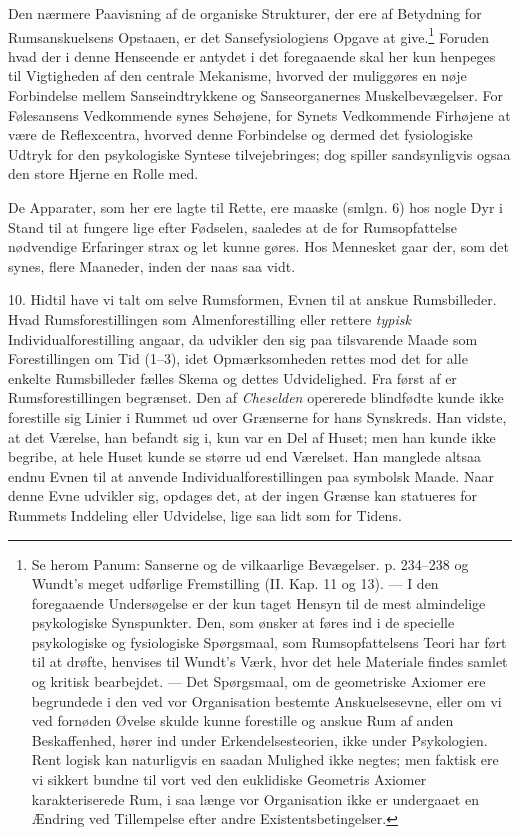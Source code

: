 \documentclass[12pt,a4paper,openany]{book}
\newcommand{\opage}[1]{\marginnote{\footnotesize\textit{[#1]}}}
\begin{document}
Den nærmere Paavisning af de organiske Strukturer, der ere af Betydning
for Rumsanskuelsens Opstaaen, er det Sansefysiologiens Opgave at
give.\footnote[2]{Se herom Panum: Sanserne og de vilkaarlige Bevægelser.
p. 234--238 og Wundt’s meget udførlige Fremstilling (II. Kap. 11 og 13).
--- I den foregaaende Undersøgelse er der kun taget Hensyn til de mest
almindelige psykologiske Synspunkter. Den, som ønsker at føres ind i de
specielle psykologiske og fysiologiske Spørgsmaal, som Rumsopfattelsens
Teori har ført til at drøfte, henvises til Wundt’s Værk, hvor det hele
Materiale findes samlet og kritisk bearbejdet. --- Det Spørgsmaal, om de
geometriske Axiomer ere begrundede i den ved vor Organisation bestemte
Anskuelsesevne, eller om vi ved fornøden Øvelse skulde kunne forestille
og anskue Rum af anden Beskaffenhed, hører ind under Erkendelsesteorien,
ikke under Psykologien. Rent logisk kan naturligvis en saadan Mulighed
ikke negtes; men faktisk ere vi sikkert bundne til vort ved den
euklidiske Geometris Axiomer karakteriserede Rum, i saa længe vor
Organisation ikke er undergaaet en Ændring ved Tillempelse efter andre
Existentsbetingelser.} Foruden hvad der i denne
\opage{250}Henseende er antydet i det foregaaende skal her kun henpeges
til Vigtigheden af den centrale Mekanisme, hvorved der muliggøres en
nøje Forbindelse mellem Sanseindtrykkene og Sanseorganernes
Muskelbevægelser. For Følesansens Vedkommende synes Sehøjene, for Synets
Vedkommende Firhøjene at være de Reflexcentra, hvorved denne Forbindelse
og dermed det fysiologiske Udtryk for den psykologiske Syntese
tilvejebringes; dog spiller sandsynligvis ogsaa den store Hjerne en
Rolle med.

De Apparater, som her ere lagte til Rette, ere maaske (smlgn. 6) hos
nogle Dyr i Stand til at fungere lige efter Fødselen, saaledes at de for
Rumsopfattelse nødvendige Erfaringer strax og let kunne gøres. Hos
Mennesket gaar der, som det synes, flere Maaneder, inden der naas saa
vidt.

10. Hidtil have vi talt om selve Rumsformen, Evnen til at anskue
Rumsbilleder. Hvad Rumsforestillingen som Almenforestilling eller
rettere \emph{typisk} Individualforestilling angaar, da udvikler den sig
paa tilsvarende Maade som Forestillingen om Tid (1--3), idet
Opmærksomheden rettes mod det for alle enkelte Rumsbilleder fælles Skema
og dettes Udvidelighed. Fra først af er Rumsforestillingen begrænset.
Den af \emph{Cheselden} opererede blindfødte kunde ikke forestille sig
Linier i Rummet ud over Grænserne for hans Synskreds. Han vidste, at det
Værelse, han befandt sig i, kun var en Del af Huset; men han kunde ikke
begribe, at hele Huset kunde se større ud end Værelset. Han manglede
altsaa endnu Evnen til at anvende Individualforestillingen paa symbolsk
Maade. Naar denne Evne udvikler sig, opdages det, at der ingen Grænse
kan statueres for Rummets Inddeling eller Udvidelse, lige saa lidt som
for Tidens.
\end{document}

